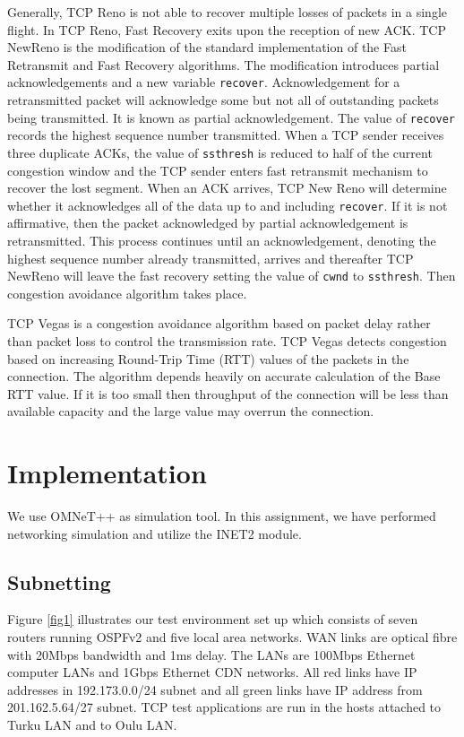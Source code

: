 \documentclass[conference,a4paper]{IEEEtran}
\begin{document}
Generally, TCP Reno \cite{tcpreno} is not able to recover multiple losses of packets in a single flight. In TCP Reno, Fast Recovery exits upon the reception of new ACK. TCP NewReno is the modification of the standard implementation of the Fast Retransmit and Fast Recovery algorithms. The modification introduces partial acknowledgements and a new variable \texttt{recover}. Acknowledgement for a retransmitted packet will acknowledge some but not all of outstanding packets being transmitted. It is known as partial acknowledgement. The value of \texttt{recover} records the highest sequence number transmitted. When a TCP sender receives three duplicate ACKs, the value of \texttt{ssthresh} is reduced to half of the current congestion window and the TCP sender enters fast retransmit mechanism to recover the lost segment. When an ACK arrives, TCP New Reno will determine whether it acknowledges all of the data up to and including \texttt{recover}. If it is not affirmative, then the packet acknowledged by partial acknowledgement is retransmitted. This process continues until an acknowledgement, denoting the highest sequence number already transmitted, arrives and thereafter TCP NewReno \cite{tcpnewreno} will leave the fast recovery setting the value of \texttt{cwnd} to \texttt{ssthresh}. Then congestion avoidance algorithm takes place.


TCP Vegas \cite{brakmo1995tcp} is a congestion avoidance algorithm based on packet delay rather than packet loss to control the transmission rate. TCP Vegas detects congestion based on increasing Round-Trip Time (RTT) values of the packets in the connection. The algorithm depends heavily on accurate calculation of the Base RTT value. If it is too small then throughput of the connection will be less than available capacity and the large value may overrun the connection.

\section{Implementation}
We use OMNeT++ as simulation tool. In this assignment, we have performed networking simulation and utilize the INET2 module.

\subsection{Subnetting}

Figure \ref{fig1} illustrates our test environment set up which consists of seven routers running OSPFv2 and five local area networks.
WAN links are optical fibre with 20Mbps bandwidth and 1ms delay.
The LANs are 100Mbps Ethernet computer LANs and 1Gbps Ethernet CDN networks.
All red links have IP addresses in 192.173.0.0/24 subnet and all green links have IP address from 201.162.5.64/27 subnet.
TCP test applications are run in the hosts attached to Turku LAN and to Oulu LAN.
\end{document}
